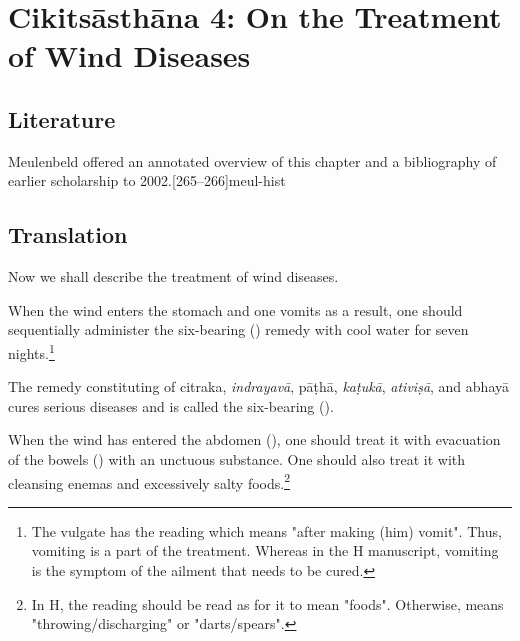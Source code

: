 
\chapter{Cikitsāsthāna 4:  On the Treatment of Wind 
    Diseases}

\section{Literature} 

Meulenbeld offered an annotated overview of this chapter and a bibliography
of earlier scholarship to 2002.[265--266]{meul-hist} 

\section{Translation}

\begin{translation}
    
    \item [1] 
    Now we shall describe the treatment of wind diseases.
    
    \item [2]

    \item [3]
    When the wind enters the stomach and one vomits as a result, one should sequentially administer the six-bearing () remedy with cool water for seven nights.\footnote{The vulgate has the reading  which means "after making (him) vomit". Thus, vomiting is a part of the treatment. Whereas in the H manuscript, vomiting is the symptom of the ailment that needs to be cured.}

    \item [4]
    The remedy constituting of \gls{citraka}, \emph{indrayavā}, \gls{pāṭhā}, \emph{kaṭukā}, \emph{ativiṣā}, and \gls{abhayā} cures serious diseases and is called the six-bearing ().

    \item [5]
    When the wind has entered the abdomen (), one should treat it with evacuation of the bowels () with an unctuous substance. One should also treat it with cleansing enemas and excessively salty foods.\footnote{In H, the reading  should be read as  for it to mean "foods". Otherwise,  means "throwing/discharging" or "darts/spears".} 
    
\end{translation}
